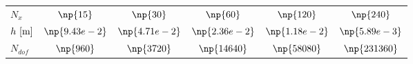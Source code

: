 

%

\begin{tabular}{rrrrcrc}
\toprule

\multicolumn{2}{l}{$ N_x $}
  &  \multicolumn{1}{c}{$ \np{15} $}
  &  \multicolumn{1}{c}{$ \np{30} $}
  &  \multicolumn{1}{c}{$ \np{60} $}
  &  \multicolumn{1}{c}{$ \np{120} $}
  &  \multicolumn{1}{c}{$ \np{240} $}
  \\
\cmidrule(lr){3-3}
\cmidrule(lr){4-4}
\cmidrule(lr){5-5}

\multicolumn{2}{l}{$ h~[\textup{m}] $}
  &  \multicolumn{1}{c}{$ \np{9.43e-2} $}
  &  \multicolumn{1}{c}{$ \np{4.71e-2} $}
  &  \multicolumn{1}{c}{$ \np{2.36e-2} $}
  &  \multicolumn{1}{c}{$ \np{1.18e-2} $}
  &  \multicolumn{1}{c}{$ \np{5.89e-3} $}
  \\
\cmidrule(lr){3-3}
\cmidrule(lr){4-4}
\cmidrule(lr){5-5}

\multicolumn{2}{l}{$ N_{dof} $}
  &  \multicolumn{1}{c}{$ \np{960} $}
  &  \multicolumn{1}{c}{$ \np{3720} $}
  &  \multicolumn{1}{c}{$ \np{14640} $}
  &  \multicolumn{1}{c}{$ \np{58080} $}
  &  \multicolumn{1}{c}{$ \np{231360} $}
  \\

\midrule


\end{tabular}
